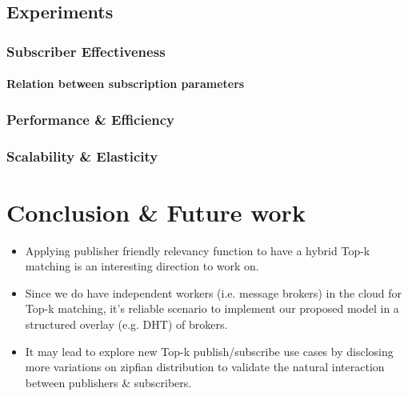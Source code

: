 \documentclass[a4paper,12pt,oneside]{book}
\theoremstyle{definition}
\theoremstyle{remark}
\begin{document}
\section{Experiments}
\label{sec:experiments}
\subsection{Subscriber Effectiveness}
\subsubsection{Relation between subscription parameters}
\subsection{Performance \& Efficiency}
\subsection{Scalability \& Elasticity}

\chapter{Conclusion \& Future work}
\begin{itemize}[label=$-$]
\item Applying publisher friendly relevancy function to have a hybrid Top-k matching is an interesting direction to work on.
\item Since we do have independent workers (i.e. message brokers) in the cloud for Top-k matching, it's reliable scenario to implement our proposed model in a structured overlay (e.g. DHT) of brokers.
\item It may lead to explore new Top-k publish/subscribe use cases by disclosing more variations on zipfian distribution to validate the natural interaction between publishers \& subscribers.
\end{itemize}

\newpage


\end{document}
